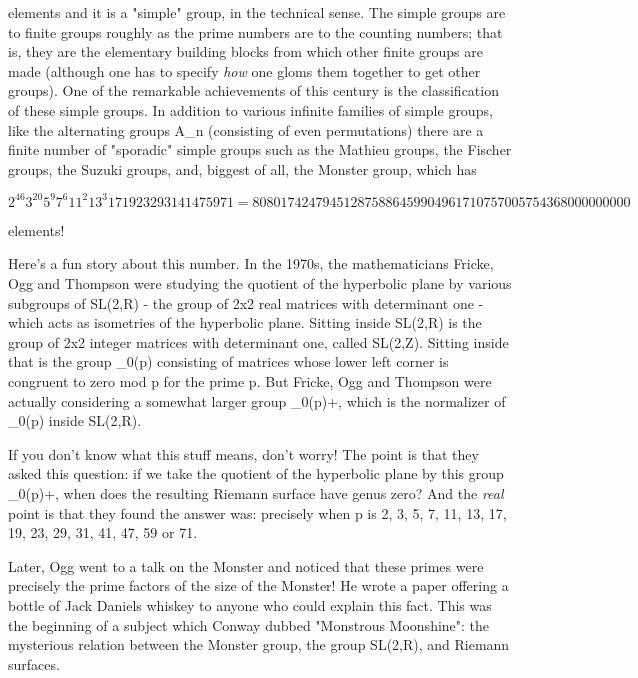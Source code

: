 elements and it is a "simple" group, in the technical sense.  The simple
groups are to finite groups roughly as the prime numbers are to the
counting numbers; that is, they are the elementary building blocks from
which other finite groups are made (although one has to specify
\emph{how} one gloms them together to get other groups).  One of the
remarkable achievements of this century is the classification of these
simple groups.  In addition to various infinite families of simple
groups, like the alternating groups A_{n} (consisting of even
permutations) there are a finite number of "sporadic" simple groups such
as the Mathieu groups, the Fischer groups, the Suzuki groups, and,
biggest of all, the Monster group, which has


$$

 2^{46} 3^{20} 5^{9} 7^{6} 11^{2} 13^{3} 17 19 23 29 31 41 47 59 71 = 
 808017424794512875886459904961710757005754368000000000
$$
    

elements!  

Here's a fun story about this number.
In the 1970s, the mathematicians Fricke, Ogg and Thompson were
studying the quotient of the hyperbolic plane by various subgroups 
of SL(2,R) - the group of 2x2 real matrices with determinant one - 
which acts as isometries of the hyperbolic plane.  
Sitting inside SL(2,R) is the group of 2x2 integer matrices
with determinant one, called SL(2,Z).  Sitting inside that is 
the group \Gamma _{0}(p) consisting of matrices whose lower left 
corner is congruent to zero mod p for the prime p.  But Fricke,
Ogg and Thompson 
were actually considering a somewhat larger group \Gamma _{0}(p)+, 
which is the normalizer of \Gamma _{0}(p) inside SL(2,R).  

If you don't know what this stuff means, don't worry! 
The point is that they asked this question: if we take the quotient of the 
hyperbolic plane by this group \Gamma _{0}(p)+, when does the resulting
Riemann surface have genus zero?  And the \emph{real} point
is that they found the answer was: precisely when p is 2, 3, 5, 7, 
11, 13, 17, 19, 23, 29, 31, 41, 47, 59 or 71. 

Later, Ogg went to a talk on the Monster and noticed that these
primes were precisely the prime factors of the size of the Monster!
He wrote a paper offering a bottle of Jack Daniels whiskey to 
anyone who could explain this fact.  This was the beginning of a 
subject which Conway dubbed "Monstrous Moonshine": 
the mysterious relation between the Monster group, the group 
SL(2,R), and Riemann surfaces.  

